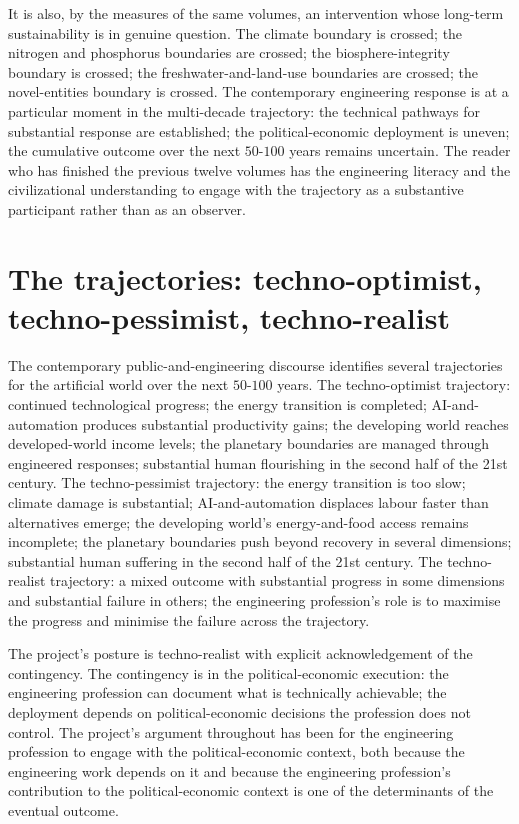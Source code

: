 It is also, by the measures of the same volumes, an intervention whose long-term sustainability is in genuine question. The climate boundary is crossed; the nitrogen and phosphorus boundaries are crossed; the biosphere-integrity boundary is crossed; the freshwater-and-land-use boundaries are crossed; the novel-entities boundary is crossed. The contemporary engineering response is at a particular moment in the multi-decade trajectory: the technical pathways for substantial response are established; the political-economic deployment is uneven; the cumulative outcome over the next $50$-$100$ years remains uncertain. The reader who has finished the previous twelve volumes has the engineering literacy and the civilizational understanding to engage with the trajectory as a substantive participant rather than as an observer.

\section{The trajectories: techno-optimist, techno-pessimist, techno-realist}

The contemporary public-and-engineering discourse identifies several trajectories for the artificial world over the next $50$-$100$ years. The techno-optimist trajectory: continued technological progress; the energy transition is completed; AI-and-automation produces substantial productivity gains; the developing world reaches developed-world income levels; the planetary boundaries are managed through engineered responses; substantial human flourishing in the second half of the 21st century. The techno-pessimist trajectory: the energy transition is too slow; climate damage is substantial; AI-and-automation displaces labour faster than alternatives emerge; the developing world's energy-and-food access remains incomplete; the planetary boundaries push beyond recovery in several dimensions; substantial human suffering in the second half of the 21st century. The techno-realist trajectory: a mixed outcome with substantial progress in some dimensions and substantial failure in others; the engineering profession's role is to maximise the progress and minimise the failure across the trajectory.

The project's posture is techno-realist with explicit acknowledgement of the contingency. The contingency is in the political-economic execution: the engineering profession can document what is technically achievable; the deployment depends on political-economic decisions the profession does not control. The project's argument throughout has been for the engineering profession to engage with the political-economic context, both because the engineering work depends on it and because the engineering profession's contribution to the political-economic context is one of the determinants of the eventual outcome.


